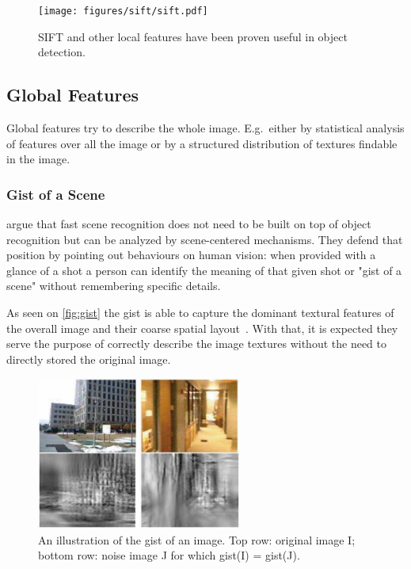 \begin{figure}[h]
    \centering
    \texttt{[image: figures/sift/sift.pdf]}
    \caption{{SIFT} and other local features have been proven useful in object
             detection.}
\end{figure}


\subsection{Global Features}
Global features try to describe the whole image. E.g.\ either by
statistical analysis of features over all the image or by a structured
distribution of textures findable in the image.

\subsubsection*{Gist of a Scene}
\label{sec:gist}
\cite{oliva2006building} argue that fast scene recognition does not need to be
built on top of object recognition but can be analyzed by scene-centered
mechanisms.
They defend that position by pointing out behaviours on human vision:
when provided with a glance of a shot a person can identify the meaning of that
given shot or "gist of a scene" without remembering specific details.

As seen on \autoref{fig:gist} the gist is able to capture the dominant textural
features of the overall image and their coarse spatial layout~\citep{murphy2006object}.
With that, it is expected they serve the purpose of correctly describe the image
textures without the need to directly stored the original image.

\begin{figure}[h]
\center
\includegraphics[width=0.60\textwidth]{figures/gist.jpg}
\caption{\label{fig:gist}An illustration of the gist of an image. Top row: original image I;
         bottom row: noise image J for which gist(I) = gist(J).}
\end{figure}


